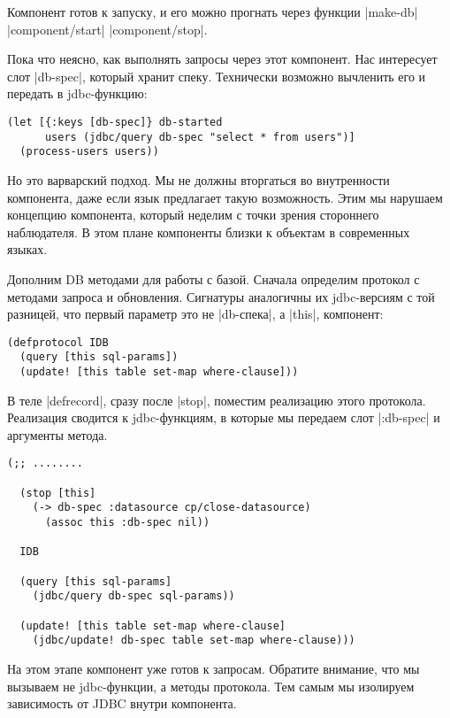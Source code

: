 Компонент готов к запуску, и его можно прогнать через функции \spverb|make-db| %
\spverb|component/start| %
\spverb|component/stop|.

Пока что неясно, как выполнять запросы через этот компонент. Нас интересует слот
\spverb|db-spec|, который хранит спеку. Технически возможно вычленить его и передать в
jdbc-функцию:

\begin{verbatim}
(let [{:keys [db-spec]} db-started
      users (jdbc/query db-spec "select * from users")]
  (process-users users))
\end{verbatim}

Но это варварский подход. Мы не должны вторгаться во внутренности компонента,
даже если язык предлагает такую возможность. Этим мы нарушаем концепцию
компонента, который неделим с точки зрения стороннего наблюдателя. В этом плане
компоненты близки к объектам в современных языках.

Дополним DB методами для работы с базой. Сначала определим протокол с методами
запроса и обновления. Сигнатуры аналогичны их jdbc-версиям с той разницей, что
первый параметр это не \spverb|db-спека|, а \spverb|this|, компонент:

\begin{verbatim}
(defprotocol IDB
  (query [this sql-params])
  (update! [this table set-map where-clause]))
\end{verbatim}

В теле \spverb|defrecord|, сразу после \spverb|stop|, поместим реализацию этого
протокола. Реализация сводится к jdbc-функциям, в которые мы передаем слот
\spverb|:db-spec| и аргументы метода.

\begin{verbatim}
(;; ........

  (stop [this]
    (-> db-spec :datasource cp/close-datasource)
      (assoc this :db-spec nil))

  IDB

  (query [this sql-params]
    (jdbc/query db-spec sql-params))

  (update! [this table set-map where-clause]
    (jdbc/update! db-spec table set-map where-clause)))
\end{verbatim}

На этом этапе компонент уже готов к запросам. Обратите внимание, что мы вызываем
не jdbc-функции, а методы протокола. Тем самым мы изолируем зависимость от JDBC
внутри компонента.

